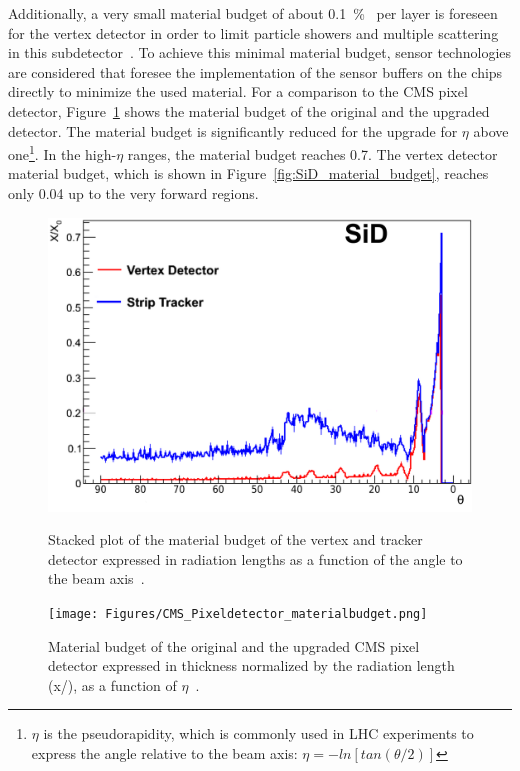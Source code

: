 Additionally, a very small material budget of about \SI{0.1}{\percent\xzero} per layer is foreseen for the vertex detector in order to limit particle showers and multiple scattering in this subdetector~\cite{SiD_Update,Marcels_general_SiD_slides}.
To achieve this minimal material budget, sensor technologies are considered that foresee the implementation of the sensor buffers on the chips directly to minimize the used material. 
For a comparison to the CMS pixel detector, Figure~\ref{fig:CMS} shows the material budget of the original and the upgraded detector.
The material budget is significantly reduced for the upgrade for $\eta$ above one\footnote{$\eta$ is the pseudorapidity, which is commonly used in LHC experiments to express the angle relative to the beam axis: $\eta=-ln[tan(\theta/2)]$}.
In the high-$\eta$ ranges, the material budget reaches \SI{0.7}{\xzero}.
The \sid vertex detector material budget, which is shown in Figure~\ref{fig:SiD_material_budget}, reaches only \SI{0.04}{\xzero} up to the very forward regions.
\begin{figure}[!h]
\centering
 \begin{minipage}[t]{0.49\textwidth}
 \centering
\includegraphics[width=\textwidth]{Figures/SiD_material_budget.png}
\caption[Material budget of the \sid vertex and tracker detector]{Stacked plot of the material budget of the \sid vertex and tracker detector expressed in radiation lengths as a function of the angle to the beam axis~\cite[cf. p. 51]{Marcels_general_SiD_slides}.}
\label{fig:SiD_material_budget}
\end{minipage}
\hfill
\begin{minipage}[t]{0.49\textwidth}
\centering
\texttt{[image: Figures/CMS\_Pixeldetector\_materialbudget.png]}
\caption[Material budget of the CMS pixel detector]{Material budget of the original and the upgraded CMS pixel detector expressed in thickness normalized by the radiation length (x/\si{\xzero}), as a function of $\eta$~\cite{CMS_pixeldetector}.}
\label{fig:CMS}
\end{minipage}
\end{figure}

